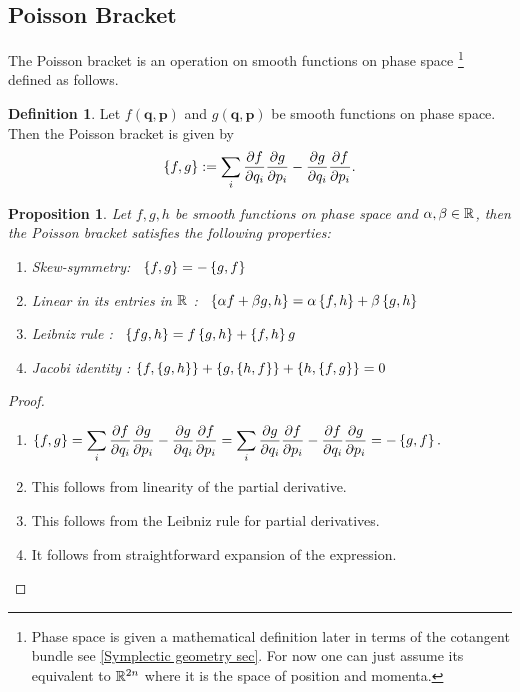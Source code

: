 \documentclass[12pt,oneside]{report}
\newtheorem{Proposition}[theorem]{Proposition}
\theoremstyle{definition}
\newtheorem{definition}{Definition}
\begin{document}
\subsection{Poisson Bracket}
The Poisson bracket is an operation on smooth functions on phase space \footnote{Phase space is given a mathematical definition later in terms of the cotangent bundle see \ref{Symplectic geometry sec}. For now one can just assume its equivalent to $\mathbb{R}^{2n}$ where it is the space of position and momenta.} defined as follows.
\begin{definition}\label{poisson bracket}
    Let $f(\textbf{q},\textbf{p})$ and $g(\textbf{q},\textbf{p})$ be smooth functions on phase space. Then the Poisson bracket is given by
    $$ \left\{f,g \right\}  := \sum_{i} \displaystyle\frac{\partial f}{\partial q_{i}}\displaystyle\frac{\partial g}{\partial p_{i}} - \displaystyle\frac{\partial g}{\partial q_{i}}\displaystyle\frac{\partial f}{\partial p_{i}} .$$
\end{definition}
\begin{Proposition}
    Let $f,g,h$ be smooth functions on phase space and $\alpha,\beta \in \mathbb{R}$, then the Poisson bracket satisfies the following properties:
    \begin{enumerate}
        \item Skew-symmetry: \ $ \displaystyle \left\{ f , g \right\} = -\displaystyle \left\{ g , f \right\}$
        \item Linear in its entries in $\mathbb{R}$ : \ $\displaystyle \left\{ \alpha f + \beta g , h \right\} = \alpha \displaystyle \left\{ f , h \right\} + \beta \displaystyle \left\{ g , h \right\}$
        \item Leibniz rule : \  $\displaystyle \left\{ fg , h \right\} = f \displaystyle \left\{ g , h \right\} + \displaystyle \left\{ f , h \right\} g$
        \item Jacobi identity : $\displaystyle \left\{ f , \displaystyle \left\{ g , h \right\} \right\} + \displaystyle \left\{ g , \displaystyle \left\{ h , f \right\} \right\} + \displaystyle \left\{ h , \displaystyle \left\{ f , g \right\} \right\} = 0 $
    \end{enumerate}
\end{Proposition}

\begin{proof}
   \begin{enumerate}
       \item $ \displaystyle \left\{ f , g \right\} = \sum_{i} \displaystyle\frac{\partial f}{\partial q_{i}}\displaystyle\frac{\partial g}{\partial p_{i}} - \displaystyle\frac{\partial g}{\partial q_{i}}\displaystyle\frac{\partial f}{\partial p_{i}} = \sum_{i} \displaystyle\frac{\partial g}{\partial q_{i}}\displaystyle\frac{\partial f}{\partial p_{i}} -\displaystyle\frac{\partial f}{\partial q_{i}}\displaystyle\frac{\partial g}{\partial p_{i}} = -\displaystyle \left\{ g , f \right\}.  $
       \item This follows from linearity of the partial derivative.
       \item This follows from the Leibniz rule for partial derivatives.
       \item It follows from straightforward expansion of the expression.
   \end{enumerate} 
\end{proof}
\end{document}
